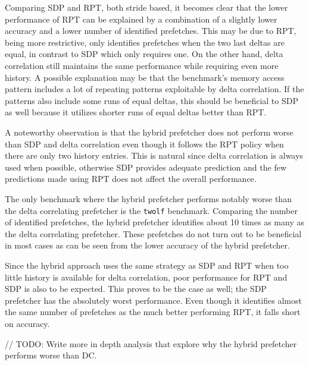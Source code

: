 Comparing SDP and RPT, both stride based, it becomes clear that the lower
performance of RPT can be explained by a combination of a slightly lower
accuracy and a lower number of identified prefetches.
This may be due to RPT, being more restrictive, only identifies prefetches when
the two last deltas are equal, in contrast to SDP which only requires one.
On the other hand, delta correlation still maintains the same performance while
requiring even more history.
A possible explanation may be that the benchmark's memory access pattern
includes a lot of repeating patterns exploitable by delta correlation.
If the patterns also include some runs of equal deltas, this should be
beneficial to SDP as well because it utilizes shorter runs of equal deltas
better than RPT.

A noteworthy observation is that the hybrid prefetcher does not perform worse
than SDP and delta correlation even though it follows the RPT policy when there
are only two history entries.
This is natural since delta correlation is always used when possible, otherwise
SDP provides adequate prediction and the few predictions made using RPT does not
affect the overall performance.

The only benchmark where the hybrid prefetcher performs notably worse than the
delta correlating prefetcher is the \texttt{twolf} benchmark.
Comparing the number of identified prefetches, the hybrid prefetcher identifies
about 10 times as many as the delta correlating prefetcher.
These prefetches do not turn out to be beneficial in most cases as can be seen
from the lower accuracy of the hybrid prefetcher.

Since the hybrid approach uses the same strategy as SDP and RPT when too little
history is available for delta correlation, poor performance for RPT and SDP is
also to be expected.
This proves to be the case as well; the SDP prefetcher has the absolutely worst
performance.
Even though it identifies almost the same number of prefetches as the much
better performing RPT, it falls short on accuracy.

// TODO: Write more in depth analysis that explore why the hybrid prefetcher performs worse than DC.


